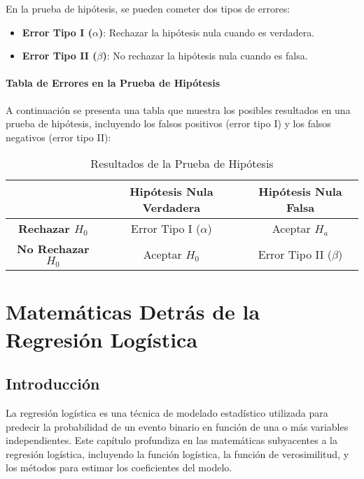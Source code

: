 \documentclass[a4paper]{report} %
\begin{document}
En la prueba de hip\'otesis, se pueden cometer dos tipos de errores:

\begin{itemize}
    \item \textbf{Error Tipo I ($\alpha$)}: Rechazar la hip\'otesis nula cuando es verdadera.
    \item \textbf{Error Tipo II ($\beta$)}: No rechazar la hip\'otesis nula cuando es falsa.
\end{itemize}

\subsubsection{Tabla de Errores en la Prueba de Hip\'otesis}

A continuaci\'on se presenta una tabla que muestra los posibles resultados en una prueba de hip\'otesis, incluyendo los falsos positivos (error tipo I) y los falsos negativos (error tipo II):

\begin{table}[h]
\centering
\begin{tabular}{|c|c|c|}
\hline
 & \textbf{Hip\'otesis Nula Verdadera} & \textbf{Hip\'otesis Nula Falsa} \\
\hline
\textbf{Rechazar $H_0$} & Error Tipo I ($\alpha$) & Aceptar $H_a$ \\
\hline
\textbf{No Rechazar $H_0$} & Aceptar $H_0$ & Error Tipo II ($\beta$) \\
\hline
\end{tabular}
\caption{Resultados de la Prueba de Hip\'otesis}
\label{tab:hypothesis_testing}
\end{table}



\chapter{Matemáticas Detrás de la Regresión Logística}
\section{Introducci\'on}

La regresi\'on log\'istica es una t\'ecnica de modelado estad\'istico utilizada para predecir la probabilidad de un evento binario en funci\'on de una o m\'as variables independientes. Este cap\'itulo profundiza en las matem\'aticas subyacentes a la regresi\'on log\'istica, incluyendo la funci\'on log\'istica, la funci\'on de verosimilitud, y los m\'etodos para estimar los coeficientes del modelo.
\end{document}
